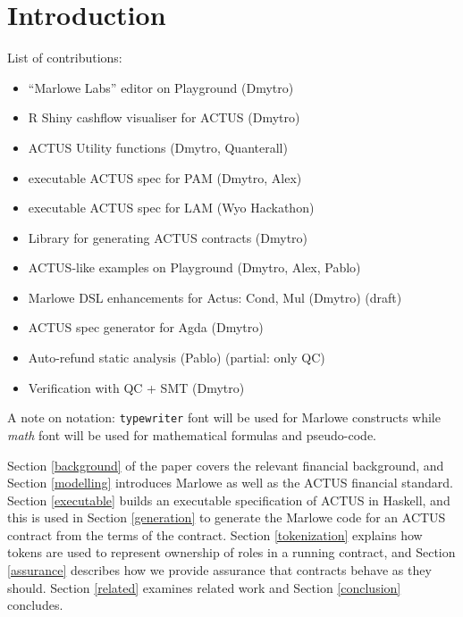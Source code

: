 \documentclass[runningheads]{llncs}
\begin{document}
\section{Introduction}



\bigskip\noindent
List of contributions:
\begin{itemize}
\item \textquotedblleft Marlowe Labs\textquotedblright{} editor on Playground
(Dmytro) 
\item R Shiny cashflow visualiser for ACTUS (Dmytro) 
\item ACTUS Utility functions (Dmytro, Quanterall) 
\item executable ACTUS spec for PAM (Dmytro, Alex) 
\item executable ACTUS spec for LAM (Wyo Hackathon) 
\item Library for generating ACTUS contracts (Dmytro) 
\item ACTUS-like examples on Playground (Dmytro, Alex, Pablo) 
\item Marlowe DSL enhancements for Actus: Cond, Mul (Dmytro) (draft) 
\item ACTUS spec generator for Agda (Dmytro) 
\item Auto-refund static analysis (Pablo) (partial: only QC) 
\item Verification with QC + SMT (Dmytro) 
\end{itemize}

A note on notation: \texttt{typewriter} font will be used for Marlowe constructs
while \emph{math} font will be used for mathematical formulas and pseudo-code.

Section \ref{background} of the paper covers the relevant financial background, and Section \ref{modelling} introduces Marlowe as well as the ACTUS financial standard. Section \ref{executable} builds an executable specification of ACTUS in Haskell, and this is used in Section \ref{generation} to generate  the Marlowe code for an ACTUS contract from the terms of the contract. Section \ref{tokenization} explains how tokens are used to represent ownership of roles in a running contract, and Section \ref{assurance} describes how we provide assurance that  contracts behave as they should. Section \ref{related} examines related work and Section \ref{conclusion} concludes. 
\end{document}
